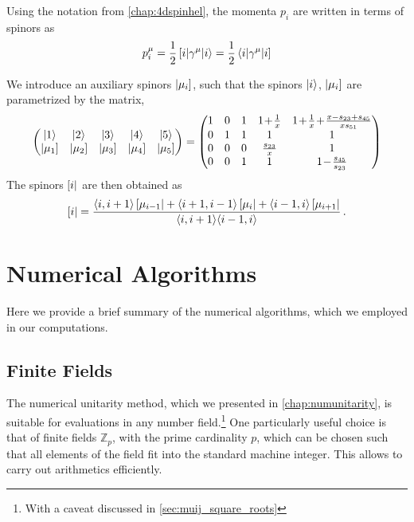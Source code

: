 Using the notation from \cref{chap:4dspinhel}, the momenta $p_i$ are written in terms of spinors as
\begin{equation}
  p^\mu_i = \frac{1}{2}\sbraket(i,\gamma^\mu,i) = \frac{1}{2}\brasket(i,\gamma^\mu,i)
\end{equation}

We introduce an auxiliary spinors $\left\vert \mu_i \right]$,
such that the spinors $\ket{i}$, $\left\vert \mu_i \right]$ are parametrized by the matrix,
\begin{equation}
  \begin{pmatrix}
    \ket{1} &  \ket{2} &   \ket{3} &   \ket{4} &  
    \ket{5} \\   
    \sket{\mu_1} &  
    \sket{\mu_2} &  
    \sket{\mu_3} &  
    \sket{\mu_4} &  
    \sket{\mu_5} 
  \end{pmatrix}
  =
  \begin{pmatrix}
    1 & 0 & 1 & 1 \!+\! \frac{1}{x}  &  1 \!+\! \frac{1}{x} \!+\! \frac{x-s_{23}+s_{45}}{x s_{51}}\\
    0 & 1 & 1 & 1                    &  1\\
    0 & 0 & 0 & \frac{s_{23}}{x}     &  1\\
    0 & 0 & 1 & 1                    & 1 \!-\! \frac{s_{45}}{s_{23}}
  \end{pmatrix}
  \label{eq:TwistorParametrization}
\end{equation}
%
The spinors $\left[ i \right\vert$ are then obtained as
\begin{equation}
\left[ i \right\vert = \frac{\langle i, i+1 \rangle \left[ \mu_{i-1} \right\vert + \langle i+1, i-1\rangle \left[ \mu_{i} \right\vert + \langle i-1, i \rangle\left[ \mu_{i+1} \right\vert}{\langle i, i+1\rangle \langle i-1, i\rangle}\, .
\end{equation}





\chapter{Numerical Algorithms}

Here we provide a brief summary of the numerical algorithms, which we employed in our computations.


\section{Finite Fields}
\label{sec:ff_fp}

The numerical unitarity method, which we presented in \cref{chap:numunitarity}, is suitable 
for evaluations in any number field.\footnote{
  With a caveat discussed in \cref{sec:muij_square_roots}
}
One particularly useful choice is that of finite fields $\mathbb{Z}_p$, with the prime cardinality $p$,
which  can be chosen such that all elements of the field fit into the standard machine integer.
This allows to carry out arithmetics efficiently.

